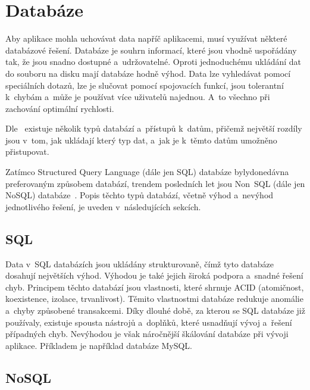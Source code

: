 \section{Databáze}

Aby aplikace mohla uchovávat data napříč aplikacemi,
musí využívat některé databázové řešení.
Databáze je souhrn informací,
které jsou vhodně uspořádány tak,
že jsou snadno dostupné a~udržovatelné.
Oproti jednoduchému ukládání dat do souboru na disku mají databáze hodně výhod.
Data lze \mbox{vyhledávat} pomocí speciálních dotazů,
lze je slučovat pomocí spojovacích funkcí,
jsou tolerantní k~chybám
a~může je používat více uživatelů najednou.
A~to všechno při zachování optimální rychlosti.~\cite{database}

Dle~\cite{sql_nosql} existuje několik typů databází a~přístupů k~datům,
přičemž největší rozdíly jsou v~tom,
jak ukládají který typ dat,
a~jak je k~těmto datům umožněno přistupovat.
\emph{}~\cite{sql_nosql}

Zatímco Structured Query Language (dále jen SQL) databáze 
byly\linebreak donedávna
preferovaným způsobem databází,
trendem posledních let jsou Non~SQL (dále jen NoSQL) databáze~\cite{sql_nosql}.
Popis těchto typů databází,
včetně výhod a~nevýhod jednotlivého řešení,
je uveden v~následujících sekcích.

\pagebreak
\subsection{SQL}

Data v~SQL databázích jsou ukládány strukturovaně,
čímž tyto databáze dosahují největších výhod.
Výhodou je také jejich široká podpora a~snadné řešení chyb.
Principem těchto databází jsou vlastnosti,
které shrnuje ACID (atomičnost, koexistence, izolace, trvanlivost).
Těmito vlastnostmi databáze redukuje anomálie a~chyby způsobené transakcemi.
Díky dlouhé době,
za kterou se SQL databáze již používaly,
existuje spousta nástrojů a~doplňků,
které usnadňují vývoj a~řešení případných chyb.
Nevýhodou je však náročnější škálování databáze při vývoji aplikace.
Příkladem je například databáze MySQL.~\cite{sql_nosql}

\subsection{NoSQL}

